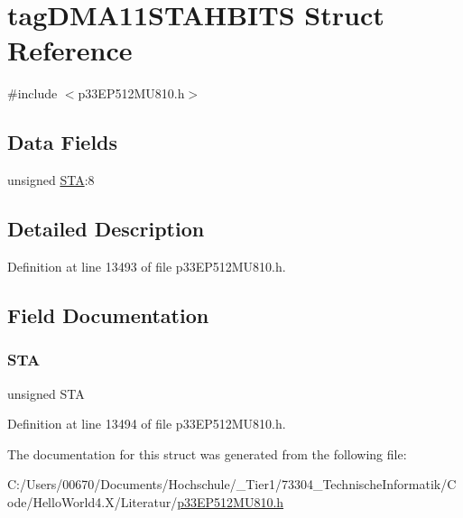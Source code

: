 \hypertarget{structtag_d_m_a11_s_t_a_h_b_i_t_s}{}\section{tag\+D\+M\+A11\+S\+T\+A\+H\+B\+I\+TS Struct Reference}
\label{structtag_d_m_a11_s_t_a_h_b_i_t_s}


{\ttfamily \#include $<$p33\+E\+P512\+M\+U810.\+h$>$}

\subsection*{Data Fields}
\begin{DoxyCompactItemize}
\item 
unsigned \hyperlink{structtag_d_m_a11_s_t_a_h_b_i_t_s_a0eec78ddd2c12af678d5fab70fe62d14}{S\+TA}\+:8
\end{DoxyCompactItemize}


\subsection{Detailed Description}


Definition at line 13493 of file p33\+E\+P512\+M\+U810.\+h.



\subsection{Field Documentation}
\mbox{\label{structtag_d_m_a11_s_t_a_h_b_i_t_s_a0eec78ddd2c12af678d5fab70fe62d14}} 
\subsubsection{\texorpdfstring{S\+TA}{STA}}
{\footnotesize\ttfamily unsigned S\+TA}



Definition at line 13494 of file p33\+E\+P512\+M\+U810.\+h.



The documentation for this struct was generated from the following file\+:\begin{DoxyCompactItemize}
\item 
C\+:/\+Users/00670/\+Documents/\+Hochschule/\+\_\+\+Tier1/73304\+\_\+\+Technische\+Informatik/\+Code/\+Hello\+World4.\+X/\+Literatur/\hyperlink{p33_e_p512_m_u810_8h}{p33\+E\+P512\+M\+U810.\+h}\end{DoxyCompactItemize}
